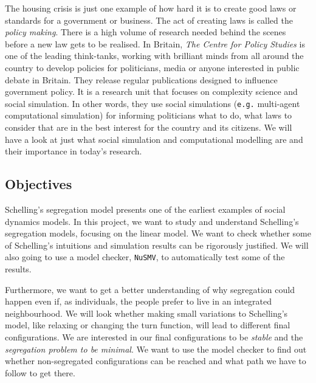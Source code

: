 \documentclass[../main.tex]{subfiles}
\begin{document}
The housing crisis is just one example of how hard it is to create good laws or standards for a government or business. The act of creating laws is called the \textit{policy making}. There is a high volume of research needed behind the scenes before a new law gets to be realised. In Britain, \textit{The Centre for Policy Studies}\cite[]{policymaking} is one of the leading think-tanks, working with brilliant minds from all around the country to develop policies for politicians, media or anyone interested in public debate in Britain. They release regular publications designed to influence government policy. It is a research unit that focuses on complexity science and social simulation. In other words, they use social simulations (\verb|e.g.| multi-agent computational simulation) for informing politicians what to do, what laws to consider that are in the best interest for the country and its citizens. We will have a look at just what social simulation and computational modelling are and their importance in today's research. 



\subsection{Objectives}

Schelling's segregation model presents one of the earliest examples of social dynamics models. 
In this project, we want to study and understand Schelling's segregation models, focusing on the linear model. We want to check whether some of Schelling's intuitions and simulation results can be rigorously justified. We will also going to use a model checker, \verb|NuSMV|, to automatically test some of the results. 

Furthermore, we want to get a better understanding of why segregation could happen even if, as individuals, the people prefer to live in an integrated neighbourhood. We will look whether making small variations to Schelling's model, like relaxing or changing the turn function, will lead to different final configurations. We are interested in our final configurations to be \textit{stable} and the \textit{segregation problem to be minimal}. We want to use the model checker to find out whether non-segregated configurations can be reached and what path we have to follow to get there.
\end{document}
